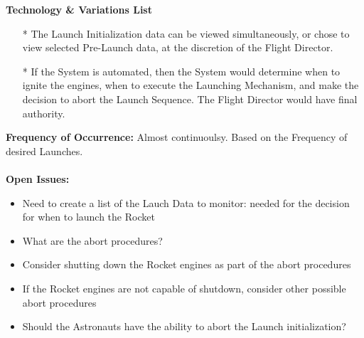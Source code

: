 \documentclass[letterpaper]{article}
\begin{document}
\textbf{Technology \& Variations List}
\begin{itemize}
\item[*] The Launch Initialization data can be viewed simultaneously,
or chose to view selected Pre-Launch data, at the discretion of the Flight
Director.
\item[*]  If the System is automated, then the System would determine
when to ignite the engines, when  to execute the Launching
Mechanism, and make the decision to abort the Launch Sequence.  The
Flight Director would have final authority.
\end{itemize}
\textbf{Frequency of Occurrence:  }Almost continuoulsy.  Based on the
Frequency of desired Launches.\\\\
\textbf{Open Issues:  }
\begin{itemize}
\item Need to create a list of the Lauch Data to monitor:  needed for
the decision for when to launch the Rocket
\item What are the abort procedures?
\item Consider shutting down the Rocket engines as part of the abort
procedures
\item If the Rocket engines are not capable of shutdown, consider
other possible abort procedures
\item Should the Astronauts have the ability to abort the Launch
initialization?
\end{itemize}
\end{document}
